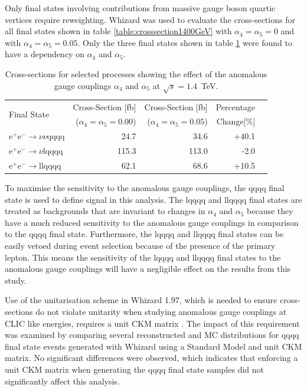 Only final states involving contributions from massive gauge boson quartic vertices require reweighting.  Whizard was used to evaluate the cross-sections for all final states shown in table \ref{table:crosssection1400GeV} with $\alpha_{4}=\alpha_{5}=0$ and with $\alpha_{4}=\alpha_{5}=0.05$.  Only the three final states shown in table \ref{table:crosssectionsensitivity1400} were found to have a dependency on $\alpha_{4}$ and $\alpha_{5}$.  

\begin{table}[h!]
\centering
\begin{tabular}{ l r r r r }
\hline
\multirow{ 2}{*}{Final State} & Cross-Section [fb] & Cross-Section [fb] & Percentage \\ 
& ($\alpha_{4} = \alpha_{5} = 0.00$) & ($\alpha_{4} = \alpha_{5} = 0.05$) & Change[\%] \\ 
\hline
$\text{e}^{+}\text{e}^{-} \rightarrow \nu{\nu}\text{qqqq}$ & 24.7 & 34.6 & +40.1 \\
$\text{e}^{+}\text{e}^{-} \rightarrow \nu\text{lqqqq}$ & 115.3 & 113.0 & -2.0 \\
$\text{e}^{+}\text{e}^{-} \rightarrow \text{llqqqq}$ & 62.1 & 68.6 & +10.5 \\
\hline
\end{tabular}
\caption[Cross-sections for selected processes showing the effect of the anomalous gauge couplings $\alpha_{4}$ and $\alpha_{5}$ at $\sqrt{s}=1.4$~TeV.]{Cross-sections for selected processes showing the effect of the anomalous gauge couplings $\alpha_{4}$ and $\alpha_{5}$ at $\sqrt{s}=1.4$~TeV.}
\label{table:crosssectionsensitivity1400}
\end{table}

To maximise the sensitivity to the anomalous gauge couplings, the \nu{\nu}qqqq final state is used to define signal in this analysis.  The {\nu}lqqqq and llqqqq final states are treated as backgrounds that are invariant to changes in $\alpha_{4}$ and $\alpha_{5}$ because they have a much reduced sensitivity to the anomalous gauge couplings in comparison to the \nu{\nu}qqqq final state.  Furthermore, the {\nu}lqqqq and llqqqq final states can be easily vetoed during event selection because of the presence of the primary lepton.  This means the sensitivity of the {\nu}lqqqq and llqqqq final states to the anomalous gauge couplings will have a negligible effect on the results from this study.

Use of the unitarisation scheme in Whizard 1.97, which is needed to ensure cross-sections do not violate unitarity when studying anomalous gauge couplings at CLIC like energies, requires a unit CKM matrix \cite{WhizardManual}.  The impact of this requirement was examined by comparing several reconstructed and MC distributions for \nu{\nu}qqqq final state events generated with Whizard using a Standard Model and unit CKM matrix.  No significant differences were observed, which indicates that enforcing a unit CKM matrix when generating the \nu{\nu}qqqq final state samples did not significantly affect this analysis.  


